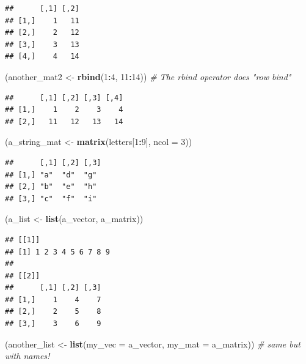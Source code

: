 \documentclass[
]{book}
\newenvironment{Shaded}{\begin{snugshade}}{\end{snugshade}}
\newcommand{\AttributeTok}[1]{\textcolor[rgb]{0.13,0.29,0.53}{#1}}
\newcommand{\CommentTok}[1]{\textcolor[rgb]{0.56,0.35,0.01}{\textit{#1}}}
\newcommand{\DecValTok}[1]{\textcolor[rgb]{0.00,0.00,0.81}{#1}}
\newcommand{\FunctionTok}[1]{\textcolor[rgb]{0.13,0.29,0.53}{\textbf{#1}}}
\newcommand{\NormalTok}[1]{#1}
\newcommand{\OtherTok}[1]{\textcolor[rgb]{0.56,0.35,0.01}{#1}}
\newcommand{\SpecialCharTok}[1]{\textcolor[rgb]{0.81,0.36,0.00}{\textbf{#1}}}
\begin{document}
\begin{enumerate}
\begin{verbatim}
##      [,1] [,2]
## [1,]    1   11
## [2,]    2   12
## [3,]    3   13
## [4,]    4   14
\end{verbatim}

\begin{Shaded}
\begin{Highlighting}[]
\NormalTok{(another\_mat2 }\OtherTok{\textless{}{-}} \FunctionTok{rbind}\NormalTok{(}\DecValTok{1}\SpecialCharTok{:}\DecValTok{4}\NormalTok{, }\DecValTok{11}\SpecialCharTok{:}\DecValTok{14}\NormalTok{)) }\CommentTok{\# The \textasciigrave{}rbind\textasciigrave{} operator does "row bind"}
\end{Highlighting}
\end{Shaded}

\begin{verbatim}
##      [,1] [,2] [,3] [,4]
## [1,]    1    2    3    4
## [2,]   11   12   13   14
\end{verbatim}

\begin{Shaded}
\begin{Highlighting}[]
\NormalTok{(a\_string\_mat }\OtherTok{\textless{}{-}} \FunctionTok{matrix}\NormalTok{(letters[}\DecValTok{1}\SpecialCharTok{:}\DecValTok{9}\NormalTok{], }\AttributeTok{ncol =} \DecValTok{3}\NormalTok{))}
\end{Highlighting}
\end{Shaded}

\begin{verbatim}
##      [,1] [,2] [,3]
## [1,] "a"  "d"  "g" 
## [2,] "b"  "e"  "h" 
## [3,] "c"  "f"  "i"
\end{verbatim}

\begin{Shaded}
\begin{Highlighting}[]
\NormalTok{(a\_list       }\OtherTok{\textless{}{-}} \FunctionTok{list}\NormalTok{(a\_vector, a\_matrix))}
\end{Highlighting}
\end{Shaded}

\begin{verbatim}
## [[1]]
## [1] 1 2 3 4 5 6 7 8 9
## 
## [[2]]
##      [,1] [,2] [,3]
## [1,]    1    4    7
## [2,]    2    5    8
## [3,]    3    6    9
\end{verbatim}

\begin{Shaded}
\begin{Highlighting}[]
\NormalTok{(another\_list }\OtherTok{\textless{}{-}} \FunctionTok{list}\NormalTok{(}\AttributeTok{my\_vec =}\NormalTok{ a\_vector, }\AttributeTok{my\_mat =}\NormalTok{ a\_matrix)) }\CommentTok{\# same but with names!}
\end{Highlighting}
\end{Shaded}


\end{enumerate}
\end{document}
